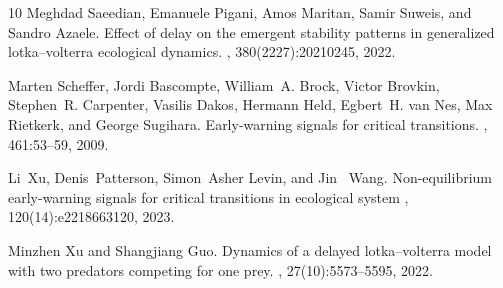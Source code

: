 \documentclass[11pt]{article}
\begin{document}
\begin{thebibliography}{10}
	Meghdad Saeedian, Emanuele Pigani, Amos Maritan, Samir Suweis, and Sandro
	Azaele.
	\newblock Effect of delay on the emergent stability patterns in generalized
	lotka--volterra ecological dynamics.
	,
	380(2227):20210245, 2022.
	
	 
	
	Marten Scheffer, Jordi Bascompte, William~A. Brock, Victor Brovkin, Stephen~R.
	Carpenter, Vasilis Dakos, Hermann Held, Egbert~H. van Nes, Max Rietkerk, and
	George Sugihara.
	\newblock Early-warning signals for critical transitions.
	, 461:53--59, 2009.
	
	Li~Xu, Denis~Patterson,   Simon~Asher  Levin, and Jin ~Wang.
	\newblock Non-equilibrium early-warning signals for critical transitions in ecological system
	,
	120(14):e2218663120, 2023.
	
	Minzhen Xu and Shangjiang Guo.
	\newblock Dynamics of a delayed lotka--volterra model with two predators
	competing for one prey.
	,
	27(10):5573--5595, 2022.
	
 
	
\end{thebibliography}
\end{document}
